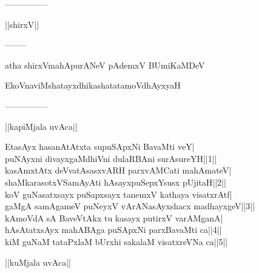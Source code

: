 \documentclass{article}
\begin{document}
\begin{center}
---------------
\end{center}

\begin{center}
||shirxV||
\end{center}

\begin{center}
--------
\end{center}

\begin{center}
atha shirxVmahApurANeV pAdemxV BUmiKaMDeV
\end{center}

\begin{center}
EkoVnaviMshatayxdhikashatatamoVdhAyxyaH
\end{center}

\begin{center}
---------------
\end{center}

\begin{center}
||kapiMjala uvAca||
\end{center}

EtasAyx hasanAtAtxta supuSApxNi BavaMti veY|\\
puNAyxni divayxgaMdhiVni dulaRBAni surAsureYH||1||\\
kasAmxtAtx deVvatAsasxvARH parxvAMCati mahAmateV|\\
shaMkarasotxVSamAyAti hAsayxpuSepxYsusx pUjitaH||2||\\
koV guNasatxsayx puSapxsayx tanemxV kathaya visatxrAtf|\\
gaMgA samAgameV puNeyxV vArANasAyxshacx madhayxgeV||3||\\
kAmoVdA sA BaveVtAkx tu kasayx putirxV varAMganA|\\
hAsAtatxsAyx mahABAga puSApxNi parxBavaMti ca||4||\\
kiM guNaM tataPxlaM bUrxhi sakalaM visatxreVNa ca||5||\\

\begin{center}
||kuMjala uvAca||
\end{center}
\end{document}
